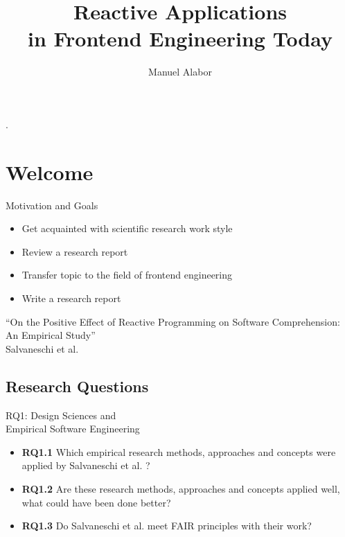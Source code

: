 \documentclass{beamer}
\title{Reactive Applications\\in Frontend Engineering Today}
\author{Manuel Alabor}
\institute{Master Seminar\\HSR University of Applied Sciences Rapperswil}
\date{}
\begin{document}
\begin{frame}
	\maketitle
	.
\end{frame}


\section*{Welcome}

\begin{frame}{Motivation and Goals}
	\begin{itemize}
		\item Get acquainted with scientific research work style\bigskip
		\item Review a research report\bigskip
		\item Transfer topic to the field of frontend engineering\bigskip
		\item Write a research report\bigskip
	\end{itemize}
\end{frame}

\begin{frame}[focus]
	``On the Positive Effect of Reactive Programming on Software Comprehension: An Empirical Study''
	\\\bigskip
	\small{Salvaneschi et al. \cite{7827078}}
\end{frame}


\subsection*{Research Questions}

\begin{frame}{RQ1: Design Sciences and \\Empirical Software Engineering}
	\begin{itemize}
		\item \textbf{RQ1.1} Which empirical research methods, approaches and concepts were applied by Salvaneschi et al. \cite{7827078}?\bigskip
		\item \textbf{RQ1.2} Are these research methods, approaches and concepts applied well, what could have been done better?\bigskip
		\item \textbf{RQ1.3} Do Salvaneschi et al. \cite{7827078} meet FAIR principles \cite{2019arXiv190805986H} \cite{wilkinson:2016} with their work?
	\end{itemize}
\end{frame}
\end{document}
